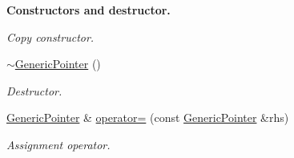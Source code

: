 \begin{Indent}{\bf Constructors and destructor.}
\begin{DoxyCompactItemize}
\begin{DoxyCompactList}\small\item\em Copy constructor. \end{DoxyCompactList}\item 
\hyperlink{classGenericPointer_acf3eb2f7c4ebf9256f638aafa17534cb}{$\sim$\+Generic\+Pointer} ()\hypertarget{classGenericPointer_acf3eb2f7c4ebf9256f638aafa17534cb}{}\label{classGenericPointer_acf3eb2f7c4ebf9256f638aafa17534cb}

\begin{DoxyCompactList}\small\item\em Destructor. \end{DoxyCompactList}\item 
\hyperlink{classGenericPointer}{Generic\+Pointer} \& \hyperlink{classGenericPointer_a1d0174a6e72daa4024da9e08ce1e7951}{operator=} (const \hyperlink{classGenericPointer}{Generic\+Pointer} \&rhs)\hypertarget{classGenericPointer_a1d0174a6e72daa4024da9e08ce1e7951}{}\label{classGenericPointer_a1d0174a6e72daa4024da9e08ce1e7951}

\begin{DoxyCompactList}\small\item\em Assignment operator. \end{DoxyCompactList}\end{DoxyCompactItemize}
\end{Indent}
